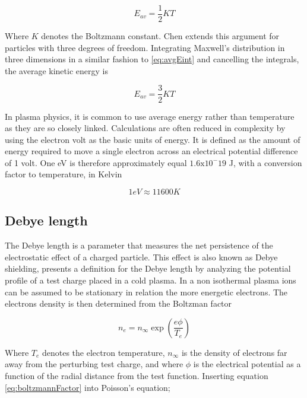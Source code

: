 \begin{equation}\label{eq:avgE1D}
    E_{av} = \frac{1}{2} K T
\end{equation}

Where $K$ denotes the Boltzmann constant. Chen extends this argument for particles with three degrees of freedom. Integrating Maxwell's distribution in three dimensions in a similar fashion to \eqref{eq:avgEint} and cancelling the integrals, the average kinetic energy is

\begin{equation}\label{eq:avgE3D}
    E_{av} = \frac{3}{2} K T
\end{equation}

In plasma physics, it is common to use average energy rather than temperature as they are so closely linked. Calculations are often reduced in complexity by using the electron volt as the basic units of energy. It is defined as the amount of energy required to move a single electron across an electrical potential difference of 1 volt. One eV is therefore approximately equal $1.6 \text{x} 10^-19$ J, with a conversion factor to temperature, in Kelvin

\begin{equation*}
    1 eV \approx 11600 K
\end{equation*}

\subsection{Debye length}
The Debye length is a parameter that measures the net persistence of the electrostatic effect of a charged particle. This effect is also known as Debye shielding, \parencite[Section 3.1.2]{HutchinsonIanH2002Popd} presents a definition for the Debye length by analyzing the potential profile of a test charge placed in a cold plasma. In a non isothermal plasma ions can be assumed to be stationary in relation the more energetic electrons. The electrons density is then determined from the Boltzman factor

\begin{equation}\label{eq:boltzmannFactor}
    n_e = n_{\infty} \exp(\frac{e \phi}{T_e})
\end{equation}

Where $T_e$ denotes the electron temperature, $n_{\infty}$ is the density of electrons far away from the perturbing test charge, and where $\phi$ is the electrical potential as a function of the radial distance from the test function. Inserting equation \eqref{eq:boltzmannFactor} into Poisson's equation;

